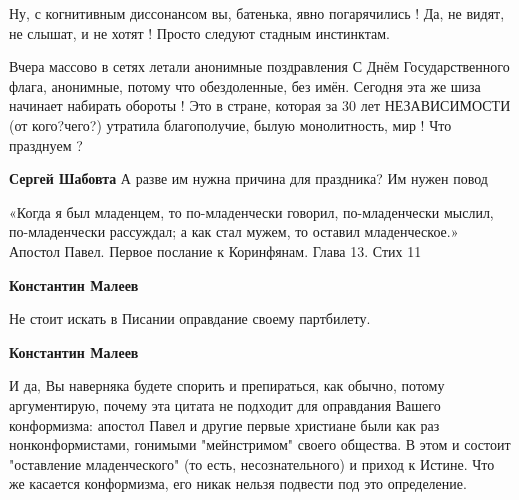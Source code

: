 \begin{itemize}
Ну, с когнитивным диссонансом вы, батенька, явно погарячились ! Да, не видят,
не слышат, и не хотят ! Просто следуют стадным инстинктам.

Вчера массово в сетях летали анонимные поздравления С Днём Государственного
флага, анонимные, потому что обездоленные, без имён. Сегодня эта же шиза
начинает набирать обороты ! Это в стране, которая за 30 лет НЕЗАВИСИМОСТИ (от
кого?чего?) утратила благополучие, былую монолитность, мир ! Что празднуем ?

\begin{itemize}
 
\textbf{Сергей Шабовта} А разве им нужна причина для праздника? Им нужен повод
\end{itemize}

 

«Когда я был младенцем, то по-младенчески говорил, по-младенчески мыслил,
по-младенчески рассуждал; а как стал мужем, то оставил младенческое.» Апостол
Павел. Первое послание к Коринфянам. Глава 13. Стих 11

\begin{itemize}
 
\textbf{Константин Малеев} 

Не стоит искать в Писании оправдание своему партбилету.


 
\textbf{Константин Малеев} 

И да, Вы наверняка будете спорить и препираться, как
обычно, потому аргументирую, почему эта цитата не подходит для оправдания
Вашего конформизма: апостол Павел и другие первые христиане были как раз
нонконформистами, гонимыми "мейнстримом" своего общества. В этом и состоит
"оставление младенческого" (то есть, несознательного) и приход к Истине. Что же
касается конформизма, его никак нельзя подвести под это определение.



\end{itemize}
\end{itemize}
